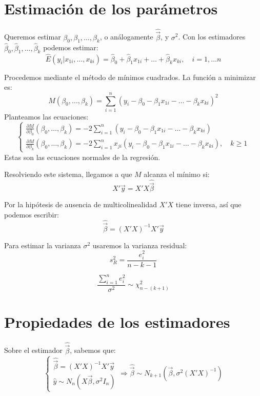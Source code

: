 \section{Estimación de los parámetros}
Queremos estimar $\beta_0, \beta_1, \dots, \beta_k$, o análogamente $\hat{\vec{\beta}}$, y $\sigma^2$.
Con los estimadores $\hat{\beta}_0, \hat{\beta}_1, \dots, \hat{\beta}_k$ podemos estimar:
$$\hat{E}(y_i | x_{1i}, \dots, x_{ki}) = \hat{\beta}_0 + \hat{\beta}_1x_{1i} + \dots + \hat{\beta}_kx_{ki}, \quad i = 1, \dots n$$

Procedemos mediante el método de mínimos cuadrados.
La función a minimizar es:
$$M(\beta_0, \dots, \beta_k) = \sum_{i=1}^n (y_i - \beta_0 - \beta_1x_{1i} - \dots - \beta_kx_{ki})^2$$
Planteamos las ecuaciones:
$$\begin{cases}
        \frac{\partial M}{\partial \beta_0} (\beta_0, \dots, \beta_k) = -2\sum_{i=1}^n (y_i - \beta_0 - \beta_1x_{1i} - \dots - \beta_kx_{ki}) \\
        \frac{\partial M}{\partial \beta_k} (\beta_0, \dots, \beta_k) = -2\sum_{i=1}^n x_{ji}(y_i - \beta_0 - \beta_1x_{1i} - \dots - \beta_kx_{ki}), \quad k \geq 1
    \end{cases}$$
Estas son las ecuaciones normales de la regresión.

Resolviendo este sistema, llegamos a que $M$ alcanza el mínimo si:
$$X'\vec{y} = X'X\hat{\vec{\beta}}$$

Por la hipótesis de ausencia de multicolinealidad $X'X$ tiene inversa, así que podemos escribir:
$$\hat{\vec{\beta}} = (X'X)^{-1}X'\vec{y}$$

Para estimar la varianza $\sigma^2$ usaremos la varianza residual:
$$s_R^2 = \frac{e_i^2}{n-k-1}$$

\begin{note}
    $$\frac{\sum_{i=1}^n e_i^2}{\sigma^2} \sim \chi^2_{n-(k+1)}$$
\end{note}

\section{Propiedades de los estimadores}
Sobre el estimador $\hat{\vec{\beta}}$, sabemos que:
$$\begin{cases}
        \hat{\vec{\beta}} = (X'X)^{-1}X'\vec{y} \\
        \hat{y} \sim N_n(X\vec{\beta}, \sigma^2 I_n)
    \end{cases} \Rightarrow \hat{\vec{\beta}} \sim N_{k+1}(\vec{\beta}, \sigma^2(X'X)^{-1})$$

